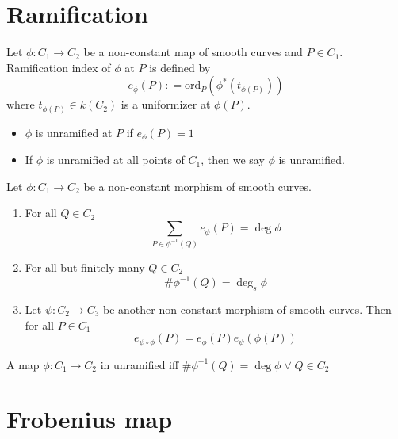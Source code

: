 \documentclass[oneside, 12pt]{scrbook}
\newcommand{\ord}{\mathrm{ord}}
\theoremstyle{theorem}
\begin{document}
\section{Ramification}

\begin{definition}
Let $\phi: C_{1} \rightarrow C_{2}$ be a non-constant map of smooth curves and $P \in C_{1}$. Ramification index of $\phi$ at $P$ is defined by $$e_{\phi}(P) : = \ord_{P}(\phi^* (t_{\phi(P)}))$$ where $t_{\phi(P)} \in k(C_{2})$ is a uniformizer at $\phi (P)$. 
\begin{itemize}
\item $\phi$ is unramified at $P$ if $e_{\phi}(P) = 1$
\item If $\phi$ is unramified at all points of $C_{1}$, then we say $\phi$ is unramified.
\end{itemize}
\end{definition}

\begin{proposition}
Let $\phi: C_{1} \rightarrow C_{2}$ be a non-constant morphism of smooth curves. 
\begin{enumerate}
\item For all $Q \in C_{2}$ 
\begin{equation}
\sum_{P \in \phi^{-1}(Q)} e_{\phi}(P) = \deg \phi
\end{equation}

\item For all but finitely many $Q \in C_{2}$
\begin{equation}
\# \phi^{-1}(Q) = \deg_{s} \phi
\end{equation}

\item Let $\psi : C_{2} \rightarrow C_{3}$ be another non-constant morphism of smooth curves. Then for all $P \in C_{1}$ 
\begin{equation}
e_{\psi \circ \phi} (P) = e_{\phi}(P) e_{\psi}(\phi(P))
\end{equation}
\end{enumerate}
\end{proposition}

\begin{corollary}
A map $\phi: C_{1} \rightarrow C_{2}$ in unramified iff $\# \phi^{-1} (Q) = \deg \phi \; \forall \; Q \in C_{2}$
\end{corollary}

\section{Frobenius map}
\end{document}
